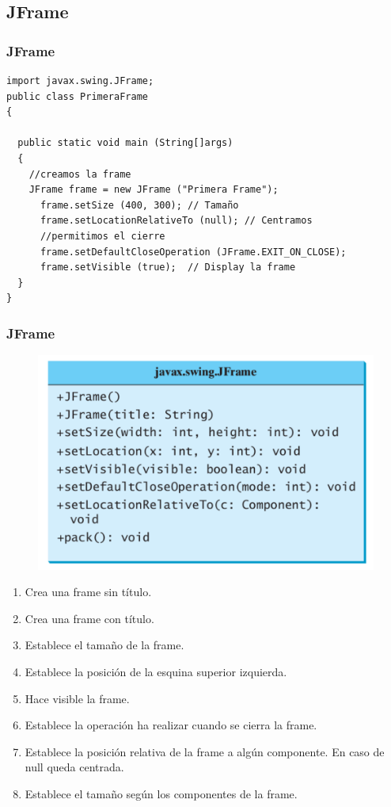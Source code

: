 \documentclass{beamer}
\begin{document}
\subsection{JFrame}
\begin{frame}[fragile]
\frametitle{JFrame}
\begin{small}
\begin{verbatim}
import javax.swing.JFrame;
public class PrimeraFrame
{

  public static void main (String[]args)
  {
    //creamos la frame
    JFrame frame = new JFrame ("Primera Frame");
      frame.setSize (400, 300); // Tamaño
      frame.setLocationRelativeTo (null); // Centramos
      //permitimos el cierre
      frame.setDefaultCloseOperation (JFrame.EXIT_ON_CLOSE);
      frame.setVisible (true);  // Display la frame
  }
}
\end{verbatim}
\end{small}
\end{frame}


\begin{frame}
\frametitle{JFrame} 
\begin{multicols}{2}
\begin{figure}
\includegraphics[scale=0.4]{imagenes/frame.png}
\end{figure}
\begin{enumerate}[<+->]
\item Crea una frame sin título.
\item Crea una frame con título.
\item Establece el tamaño de la frame.
\item Establece la posición de la esquina superior izquierda.
\item Hace visible la frame.
\item Establece la operación ha realizar cuando se cierra la frame.
\item Establece la posición relativa de la frame a algún componente. En caso de null queda centrada.
\item Establece el tamaño según los componentes de la frame.
\end{enumerate}
\end{multicols}

\end{frame}
\end{document}
